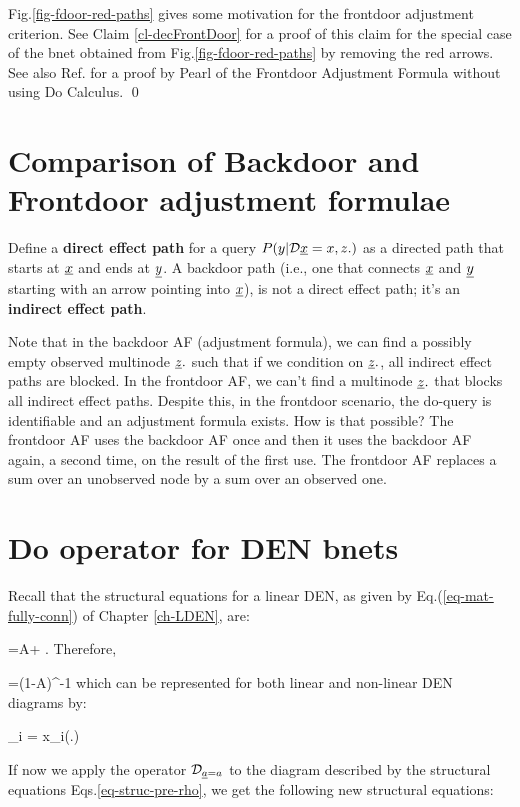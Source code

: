 Fig.\ref{fig-fdoor-red-paths}
gives some motivation for the frontdoor adjustment criterion.
See Claim \ref{cl-decFrontDoor}
for a proof of this claim
for the
special case of the bnet obtained from 
Fig.\ref{fig-fdoor-red-paths}
by removing  the red arrows.
See also Ref.\cite{pearl-frontdoor}
for a proof by Pearl
of the Frontdoor Adjustment Formula
without
using Do Calculus.
\qed

\section{Comparison
of Backdoor and Frontdoor
adjustment formulae}

Define a {\bf direct effect path}
for a query $P(y|\cald\rvx=x,z.)$
as a directed path that starts at $\rvx$
and ends
at $\rvy$. A backdoor path
(i.e., one that connects
$\rvx$ and $\rvy$ starting
with an arrow
pointing into $\rvx$),
is not a direct effect path;
it's an {\bf indirect effect path}.

Note that in the backdoor AF (adjustment
formula), we can find a possibly empty
observed multinode
$\rvz.$ such that if
we condition
on $\rvz.$,
all indirect effect paths are blocked.
In the frontdoor AF,
we can't find a multinode $\rvz.$
that blocks all indirect effect
paths.
Despite this,
in the frontdoor scenario,
the do-query is
identifiable and
an adjustment formula
exists.
How is that possible?
The frontdoor AF
uses the backdoor AF once
and then it uses
the backdoor AF again,
a second time, on
the result of the first use.
The frontdoor AF
replaces a
sum over an unobserved node
by a sum over an observed one.



\section{Do operator for DEN bnets}

Recall that
the structural
equations
for a linear DEN, as
given
by Eq.(\ref{eq-mat-fully-conn})
of Chapter \ref{ch-LDEN}, are:

\beq
\rvx=A\rvx +\rvu
\;.
\label{eq-struc-pre-rho}
\eeq
Therefore,

\beq
\rvx=(1-A)^{-1}\rvu
\eeq
which
can be
represented for
both linear
and non-linear DEN
diagrams by:

\beq
\rvx_i = x_i(\rvu.)
\eeq

If now
we apply the
operator
$\cald_{\rva=a}$
to
the diagram
described by
the structural
equations Eqs.\ref{eq-struc-pre-rho},
we get the following
new
structural
equations:

